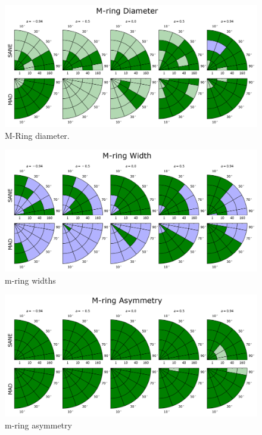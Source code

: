 \begin{figure}
  \centering
  \includegraphics[width=\columnwidth]{./figures/r0.png}
  \caption{M-Ring diameter.}
  \label{fig:cmp_m-ring_diam}
\end{figure}
\begin{figure}
  \centering
  \includegraphics[width=\columnwidth]{./figures/w.png}
  \caption{m-ring widths}
  \label{fig:cmp_m-ring_width}
\end{figure}
\begin{figure}
  \centering
  \includegraphics[width=\columnwidth]{./figures/f1.png}
  \caption{m-ring asymmetry}
  \label{fig:cmp_m-ring_asymm}
\end{figure}

